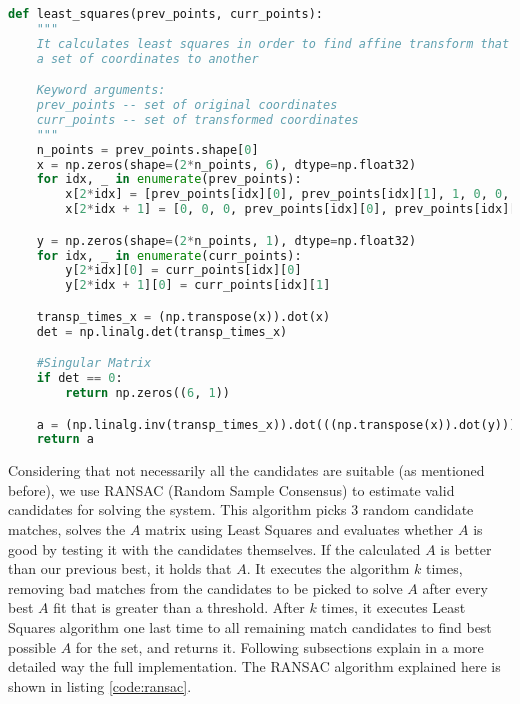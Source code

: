 \documentclass[]{IEEEtran}
\begin{document}
 \begin{lstlisting}[language=Python, caption={Least Squares Implementation}, label={code:least-squares}]
  def least_squares(prev_points, curr_points):
    """
    It calculates least squares in order to find affine transform that transforms
    a set of coordinates to another

    Keyword arguments:
    prev_points -- set of original coordinates
    curr_points -- set of transformed coordinates
    """
    n_points = prev_points.shape[0]
    x = np.zeros(shape=(2*n_points, 6), dtype=np.float32)
    for idx, _ in enumerate(prev_points):
        x[2*idx] = [prev_points[idx][0], prev_points[idx][1], 1, 0, 0, 0]
        x[2*idx + 1] = [0, 0, 0, prev_points[idx][0], prev_points[idx][1], 1]

    y = np.zeros(shape=(2*n_points, 1), dtype=np.float32)
    for idx, _ in enumerate(curr_points):
        y[2*idx][0] = curr_points[idx][0]
        y[2*idx + 1][0] = curr_points[idx][1]

    transp_times_x = (np.transpose(x)).dot(x)
    det = np.linalg.det(transp_times_x)

    #Singular Matrix
    if det == 0:
        return np.zeros((6, 1))

    a = (np.linalg.inv(transp_times_x)).dot(((np.transpose(x)).dot(y)))
    return a
\end{lstlisting}

Considering that not necessarily all the candidates are suitable (as mentioned before), we use RANSAC (Random Sample Consensus) to estimate valid candidates for solving the system. This algorithm picks 3 random candidate matches, solves the $A$ matrix using Least Squares and evaluates whether $A$ is good by testing it with the candidates themselves. If the calculated $A$ is better than our previous best, it holds that $A$. It executes the algorithm $k$ times, removing bad matches from the candidates to be picked to solve $A$ after every best $A$ fit that is greater than a threshold. After $k$ times, it executes Least Squares algorithm one last time to all remaining match candidates to find best possible $A$ for the set, and returns it. Following subsections explain in a more detailed way the full implementation. The RANSAC algorithm explained here is shown in listing \ref{code:ransac}.
\end{document}
